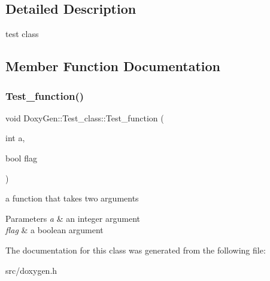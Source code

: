 \subsection{Detailed Description}
test class 

\subsection{Member Function Documentation}
\hypertarget{class_doxy_gen_1_1_test__class_a48b65d1163abaf98d775ef8af2f7dc76}{}\label{class_doxy_gen_1_1_test__class_a48b65d1163abaf98d775ef8af2f7dc76} 
\subsubsection{\texorpdfstring{Test\+\_\+function()}{Test\_function()}}
{\footnotesize\ttfamily void Doxy\+Gen\+::\+Test\+\_\+class\+::\+Test\+\_\+function (\begin{DoxyParamCaption}\item[{int}]{a,  }\item[{bool}]{flag }\end{DoxyParamCaption})\hspace{0.3cm}{\ttfamily [inline]}}



a function that takes two arguments 


\begin{DoxyParams}{Parameters}
{\em a} & an integer argument \\
\hline
{\em flag} & a boolean argument \\
\hline
\end{DoxyParams}


The documentation for this class was generated from the following file\+:\begin{DoxyCompactItemize}
\item 
src/doxygen.\+h\end{DoxyCompactItemize}
